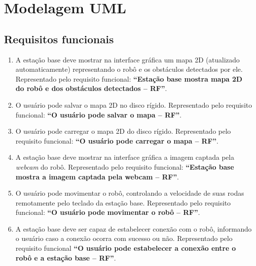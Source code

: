 \chapter{Modelagem UML}

\section{Requisitos funcionais}

\begin{enumerate}[topsep=0pt, partopsep=0pt, itemsep=0pt]
  \item A estação base deve mostrar na interface gráfica um mapa 2D (atualizado automaticamente) representando o robô e os obstáculos detectados por ele. Representado pelo requisito funcional: \textbf{``Estação base mostra mapa 2D do robô e dos obstáculos detectados -- RF''}.
  \item O usuário pode salvar o mapa 2D no disco rígido. Representado pelo requisito funcional: \textbf{``O usuário pode salvar o mapa -- RF''}.
  \item O usuário pode carregar o mapa 2D do disco rígido. Representado pelo requisito funcional: \textbf{``O usuário pode carregar o mapa -- RF''}.
  \item A estação base deve mostrar na interface gráfica a imagem captada pela \textit{webcam} do robô. Representado pelo requisito funcional: \textbf{``Estação base mostra a imagem captada pela webcam -- RF''}.
  \item O usuário pode movimentar o robô, controlando a velocidade de suas rodas remotamente pelo teclado da estação base. Representado pelo requisito funcional: \textbf{``O usuário pode movimentar o robô -- RF''}.
  \item A estação base deve ser capaz de estabelecer conexão com o robô, informando o usuário caso a conexão ocorra com sucesso ou não. Representado pelo requisito funcional \textbf{``O usuário pode estabelecer a conexão entre o robô e a estação base -- RF''}.
\end{enumerate}

